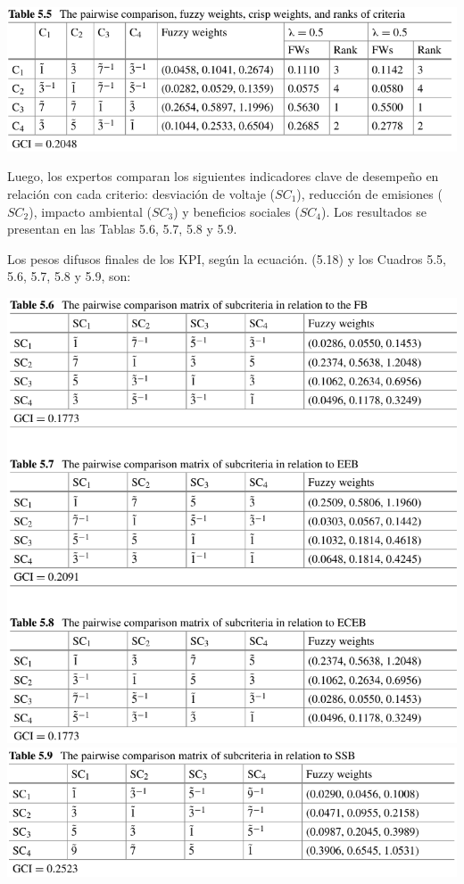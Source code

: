 \documentclass[
]{article}
\begin{document}
\includegraphics{fotos/tabla5.5.png}

Luego, los expertos comparan los siguientes indicadores clave de
desempeño en relación con cada criterio: desviación de voltaje
(\(SC_1\)), reducción de emisiones (\(SC_2\)), impacto ambiental
(\(SC_3\)) y beneficios sociales (\(SC_4\)). Los resultados se presentan
en las Tablas 5.6, 5.7, 5.8 y 5.9.

Los pesos difusos finales de los KPI, según la ecuación. (5.18) y los
Cuadros 5.5, 5.6, 5.7, 5.8 y 5.9, son:

\includegraphics{fotos/tabla5.8.png}
\includegraphics{fotos/tabla5.9.png}
\end{document}
